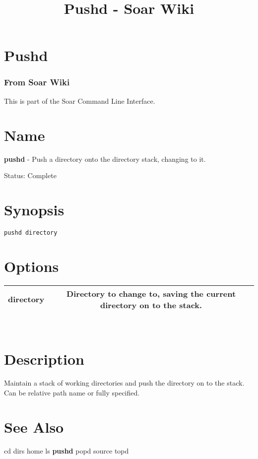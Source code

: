 \documentclass[10pt]{article}
\title{Pushd - Soar Wiki}
\begin{document}
\section*{Pushd}
\subsubsection*{From Soar Wiki}


 This is part of the Soar Command Line Interface. 
\section*{ Name }


 \textbf{pushd}
 - Push a directory onto the directory stack, changing to it. 


 Status: Complete
\section*{ Synopsis }
\begin{verbatim}
pushd directory

\end{verbatim}
\section*{ Options }


\begin{tabular}{|c|c|}
\hline 
 directory  & Directory to change to, saving the current directory on to the stack.  \\
 \hline 

\end{tabular}



 \\ 

\section*{ Description }


 Maintain a stack of working directories and push the directory on to the stack. Can be relative path name or fully specified. 
\section*{ See Also }
\begin{description}
cd dirs home ls \textbf{pushd}
 popd source topd

\end{description}
\end{document}
